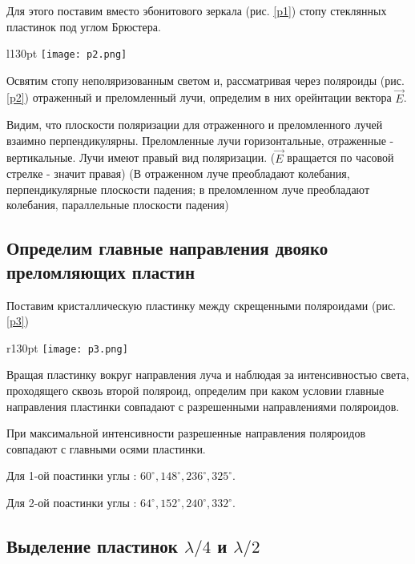 \documentclass[12pt,a4paper]{article}
\begin{document}
Для этого поставим вместо эбонитового зеркала (рис. \ref{p1}) стопу стеклянных пластинок под углом Брюстера. 

\begin{wrapfigure}[10]{l}{130pt}
\texttt{[image: p2.png]}
\caption{Исследование стопы}
\label{p2}
\end{wrapfigure}

Освятим стопу неполяризованным светом и, рассматривая через поляроиды (рис. \ref{p2}) отраженный и преломленный лучи, определим в них орейнтации вектора $\vec{E}$. 

Видим, что плоскости поляризации для отраженного и преломленного лучей взаимно перпендикулярны. Преломленные лучи горизонтальные, отраженные - вертикальные. Лучи имеют правый вид поляризации. ($\vec{E}$ вращается по часовой стрелке - значит правая)
(В отраженном луче преобладают колебания, перпендикулярные плоскости падения; в преломленном луче преобладают колебания, параллельные плоскости падения)

\subsection{Определим главные направления двояко преломляющих пластин}

Поставим кристаллическую пластинку между скрещенными поляроидами (рис. \ref{p3})

\begin{wrapfigure}[9]{r}{130pt}
\texttt{[image: p3.png]}
\caption{Определение главных направлений в пластинках}
\label{p3}
\end{wrapfigure}

Вращая пластинку вокруг направления луча и наблюдая за интенсивностью света, проходящего сквозь второй поляроид, определим  при каком условии главные направления пластинки совпадают с разрешенными направлениями поляроидов. 

При максимальной интенсивности разрешенные направления поляроидов совпадают с главными осями пластинки. 
\par
Для 1-ой поастинки углы : $60^\circ , 148^\circ, 236^\circ, 325^\circ$.
\par
Для 2-ой поастинки углы : $64^\circ , 152^\circ, 240^\circ, 332^\circ$.

\subsection{Выделение пластинок $\lambda/4 $ и $\lambda/2$}
\end{document}
